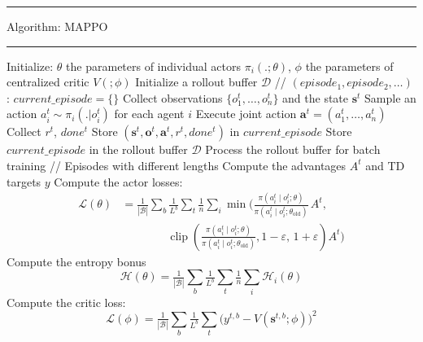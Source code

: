 \documentclass[varwidth, border=20pt]{standalone}
\begin{document}
\begingroup
\small                    
\begin{center}
  \begin{minipage}{0.99\linewidth} 
    \hrule height 0.7pt
    \vspace{3pt}
    Algorithm: MAPPO
    \vspace{3pt}
    \hrule height 0.7pt
    \vspace{6pt}

   
    \begin{algorithmic}[1]
      \State Initialize: $\theta$ the parameters of individual actors $\pi_i(.;\theta)$, $\phi$ the parameters of centralized critic $V(;\phi)$
        \State Initialize a rollout buffer $\mathcal{D}$ // $(episode_1, episode_2, \dots)$
        :
            \State $current\_episode = \{ \}$ 
                \State Collect observations $\{o^t_1,\dots,o^t_n\}$ and the state $\mathbf{s}^t$
                \State  Sample an action $a_i^t \sim \pi_i(.|o_i^t)$ for each agent $i$
                \State Execute joint action $\mathbf{a}^t = (a_1^t,\dots,a_n^t)$
                \State Collect $r^t$, $done^t$
                \State Store $(\mathbf{s}^t,\mathbf{o}^t,\mathbf{a}^t,r^t,done^t)$ in $current\_episode$
                \EndWhile
            \State Store $current\_episode$ in the rollout buffer $\mathcal{D}$
        \EndFor
        \State Process the rollout buffer for batch training // Episodes with different lengths
        \State Compute the advantages $A^t$ and TD targets $y$
        \State Compute the actor losses:
        \begin{align*}
            \mathcal{L}(\theta)
                &= \tfrac{1}{|\mathcal{B}|}\sum_b \tfrac{1}{L^b} \sum_t \tfrac{1}{n} \sum_i 
                    \min\!\Bigg(
                        \frac{\pi(a_i^t \mid o_i^t;\theta)}{\pi(a_i^t \mid o_i^t;\theta_{\text{old}})}\, A^t, \\
                &\qquad\qquad
                        \operatorname{clip}\!\left(
                            \frac{\pi(a_i^t \mid o_i^t;\theta)}{\pi(a_i^t \mid o_i^t;\theta_{\text{old}})},
                            1-\varepsilon,\,1+\varepsilon
                        \right) A^t
                    \Bigg)
            \end{align*}
        \State Compute the entropy bonus
        \Statex
        \[
            \mathcal{H}(\theta) =   \tfrac{1}{|\mathcal{B}|}\sum_b \tfrac{1}{L^b} \sum_t \tfrac{1}{n} \sum_i \mathcal{H}_i(\theta)
        \]
        \State Compute the critic loss: 
        \Statex
          \[
            \mathcal{L}(\phi)=\tfrac{1}{|\mathcal{B}|}\sum_b \tfrac{1}{L^b} \sum_t \Big(y^{t,b} -  V(\mathbf{s}^{t,b}; \phi)\Big)^2
          \]


\end{algorithmic}
\end{minipage}
\end{center}
\end{document}
